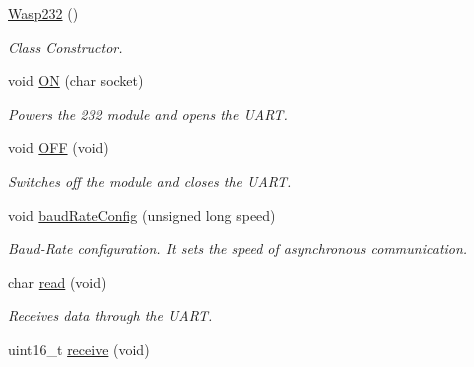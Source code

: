 \begin{DoxyCompactItemize}
\item 
\hyperlink{class_wasp232_ae518c085e8c0d9629f2b773487122995}{Wasp232} ()\hypertarget{class_wasp232_ae518c085e8c0d9629f2b773487122995}{}\label{class_wasp232_ae518c085e8c0d9629f2b773487122995}

\begin{DoxyCompactList}\small\item\em Class Constructor. \end{DoxyCompactList}\item 
void \hyperlink{class_wasp232_af447a5aa0399002a3c11fa09650d337c}{ON} (char socket)\hypertarget{class_wasp232_af447a5aa0399002a3c11fa09650d337c}{}\label{class_wasp232_af447a5aa0399002a3c11fa09650d337c}

\begin{DoxyCompactList}\small\item\em Powers the 232 module and opens the U\+A\+RT. \end{DoxyCompactList}\item 
void \hyperlink{class_wasp232_a51aab6b549c61ef6e46313ab8d9451a6}{O\+FF} (void)\hypertarget{class_wasp232_a51aab6b549c61ef6e46313ab8d9451a6}{}\label{class_wasp232_a51aab6b549c61ef6e46313ab8d9451a6}

\begin{DoxyCompactList}\small\item\em Switches off the module and closes the U\+A\+RT. \end{DoxyCompactList}\item 
void \hyperlink{class_wasp232_a2e0701d26495fe403a9a0203430a13c4}{baud\+Rate\+Config} (unsigned long speed)\hypertarget{class_wasp232_a2e0701d26495fe403a9a0203430a13c4}{}\label{class_wasp232_a2e0701d26495fe403a9a0203430a13c4}

\begin{DoxyCompactList}\small\item\em Baud-\/\+Rate configuration. It sets the speed of asynchronous communication. \end{DoxyCompactList}\item 
char \hyperlink{class_wasp232_ab4042118e9843786d2eda0641b7fa40f}{read} (void)\hypertarget{class_wasp232_ab4042118e9843786d2eda0641b7fa40f}{}\label{class_wasp232_ab4042118e9843786d2eda0641b7fa40f}

\begin{DoxyCompactList}\small\item\em Receives data through the U\+A\+RT. \end{DoxyCompactList}\item 
uint16\+\_\+t \hyperlink{class_wasp232_a54438f3cb0abcafae5ad7e3fde87e7e3}{receive} (void)\hypertarget{class_wasp232_a54438f3cb0abcafae5ad7e3fde87e7e3}{}\label{class_wasp232_a54438f3cb0abcafae5ad7e3fde87e7e3}


\end{DoxyCompactItemize}
